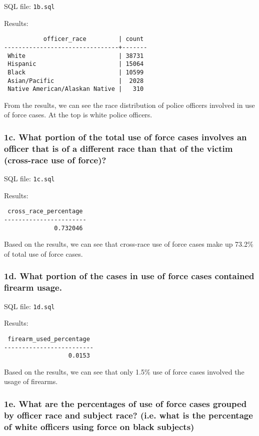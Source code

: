 \documentclass[10pt]{article}
\begin{document}
SQL file: \texttt{1b.sql}

Results:

\begin{verbatim}
           officer_race         | count
--------------------------------+-------
 White                          | 38731
 Hispanic                       | 15064
 Black                          | 10599
 Asian/Pacific                  |  2028
 Native American/Alaskan Native |   310
\end{verbatim}

From the results, we can see the race distribution of police officers involved in use of force cases. At the top is white police officers.


\subsubsection*{1c. What portion of the total use of force cases involves an officer that is of a different race than that of the victim (cross-race use of force)?}

SQL file: \texttt{1c.sql}

Results:

\begin{verbatim}
 cross_race_percentage
-----------------------
              0.732046
\end{verbatim}

Based on the results, we can see that cross-race use of force cases make up 73.2\% of total use of force cases.


\subsubsection*{1d. What portion of the cases in use of force cases contained firearm usage.}

SQL file: \texttt{1d.sql}

Results:

\begin{verbatim}
 firearm_used_percentage
-------------------------
                  0.0153
\end{verbatim}

Based on the results, we can see that only 1.5\% use of force cases involved the usage of firearms.


\subsubsection*{1e. What are the percentages of use of force cases grouped by officer race and subject race? (i.e. what is the percentage of white officers using force on black subjects)}
\end{document}
